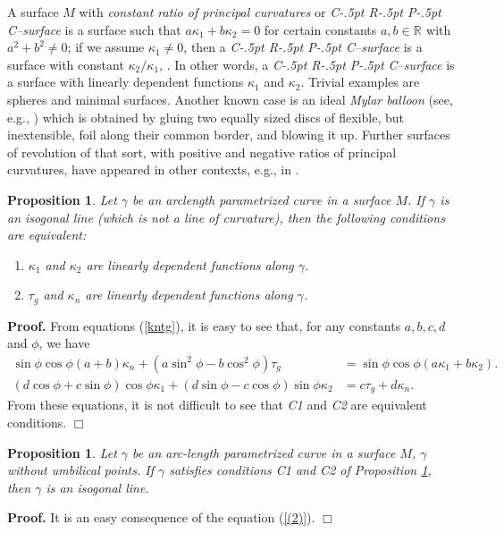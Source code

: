 \documentclass[11pt,a4paper]{article}
\def\R#1{\ensuremath{\mathbb{R}^{#1}}}
\def\g{\gamma}
\newenvironment{proof}{\ignorespaces\par\noindent\textbf{Proof.}\quad}{\hfill$\Box$\par}
\def\CRPC{C\kern-.5pt R\kern-.5pt P\kern-.5pt C}
\newtheorem{prop}[theo]{Proposition}
\begin{document}
A surface $M$ with \emph{constant ratio of principal curvatures} or \emph{\CRPC--surface} is a surface such that $a\kappa_1+b\kappa_2=0$ for certain constants $a,b\in\R{}$ with $a^2+b^2\neq0$; if we assume $\kappa_1\neq0$, then a \emph{\CRPC--surface} is a surface with constant $\kappa_2/\kappa_1$, \cite{JMP20,WP22}. In other words, a \emph{\CRPC--surface} is a surface with linearly dependent functions $\kappa_1$ and $\kappa_2$. Trivial examples are spheres and minimal surfaces. Another known case is an ideal \emph{Mylar balloon} (see, e.g., \cite{MO03,MO07}) which is obtained by gluing two equally sized discs of ﬂexible, but inextensible, foil along their common border, and blowing it up. Further surfaces of revolution of that sort, with positive and negative ratios of principal curvatures, have appeared in other contexts, e.g., in \cite{Hopf, Kuhnel06, JMP20}.

\begin{prop}\label{p1.1}%
Let $\gamma$ be an arclength parametrized curve in a surface $M$. If $\gamma$ is an isogonal line (which is not a line of curvature), then the following conditions are equivalent:\vspace*{-\topsep}
\begin{enumerate}\itemsep0pt
\item[C1)]
$\kappa_1$ and $\kappa_2$ are linearly dependent functions along $\gamma$.
\item[C2)]
$\tau_g$ and $\kappa_n$ are linearly dependent functions along $\gamma$.
\end{enumerate}
\end{prop}
\begin{proof}
From equations (\ref{kntg}), it is easy to see that, for any constants $a,b,c,d$ and $\phi$, we have
\begin{align}
\sin\phi\cos\phi(a+b)\kappa_n+(a\sin^2\phi-b\cos^2\phi)\tau_g &= \sin\phi\cos\phi(a\kappa_1+b\kappa_2).\label{(1)}\\
(d\cos\phi+c\sin\phi)\cos\phi\kappa_1+(d\sin\phi-c\cos\phi)\sin\phi\kappa_2 &= c\tau_g+d\kappa_n.\label{(2)}
\end{align}
From these equations, it is not difficult to see that \emph{C1} and \emph{C2} are equivalent conditions.
\end{proof}

\begin{prop}\label{p1.2}
Let $\gamma$ be an arc-length parametrized curve in a surface $M$, $\g$ without umbilical points. If $\g$ satisfies conditions C1 and C2 of Proposition \ref{p1.1}, then $\g$ is an isogonal line.
\end{prop}
\begin{proof}
It is an easy consequence of the equation (\ref{(2)}).
\end{proof}
\end{document}
